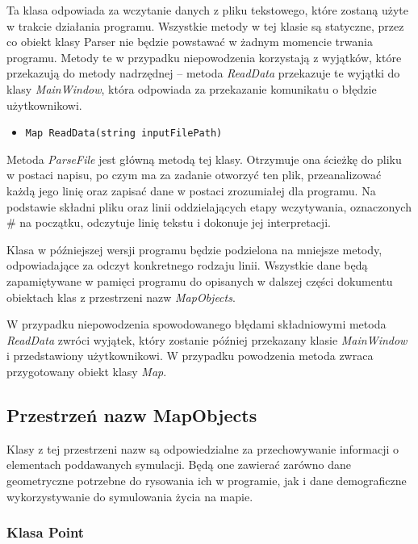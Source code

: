 \documentclass[a4paper,12pt]{article}
\newcommand\tab[1][0.6cm]{\hspace*{#1} }
\begin{document}
\tab Ta klasa odpowiada za wczytanie danych z pliku tekstowego, które zostaną użyte w trakcie działania programu. Wszystkie metody w tej klasie są statyczne, przez co obiekt klasy Parser nie będzie powstawać w żadnym momencie trwania programu. Metody te w przypadku niepowodzenia korzystają z wyjątków, które przekazują do metody nadrzędnej -- metoda \textit{ReadData} przekazuje te wyjątki do klasy \textit{MainWindow}, która odpowiada za przekazanie komunikatu o błędzie użytkownikowi.

\begin{itemize}
\item \begin{lstlisting}
Map ReadData(string inputFilePath) 
\end{lstlisting}
\end{itemize}

Metoda \textit{ParseFile} jest główną metodą tej klasy. Otrzymuje ona ścieżkę do pliku w postaci napisu, po czym ma za zadanie otworzyć ten plik, przeanalizować każdą jego linię oraz zapisać dane w postaci zrozumiałej dla programu. Na podstawie składni pliku oraz linii oddzielających etapy wczytywania, oznaczonych \# na początku, odczytuje linię tekstu i dokonuje jej interpretacji.

Klasa w późniejszej wersji programu będzie podzielona na mniejsze metody, odpowiadające za odczyt konkretnego rodzaju linii. Wszystkie dane będą zapamiętywane w pamięci programu do opisanych w dalszej części dokumentu obiektach klas z przestrzeni nazw \textit{MapObjects}.

W przypadku niepowodzenia spowodowanego błędami składniowymi metoda \textit{ReadData} zwróci wyjątek, który zostanie później przekazany klasie \textit{MainWindow} i przedstawiony użytkownikowi. W przypadku powodzenia metoda zwraca przygotowany obiekt klasy \textit{Map}.



\subsection{Przestrzeń nazw MapObjects}

\tab Klasy z tej przestrzeni nazw są odpowiedzialne za przechowywanie informacji o elementach poddawanych symulacji. Będą one zawierać zarówno dane geometryczne potrzebne do rysowania ich w programie, jak i dane demograficzne wykorzystywanie do symulowania życia na mapie.

\subsubsection{Klasa Point}
\end{document}
